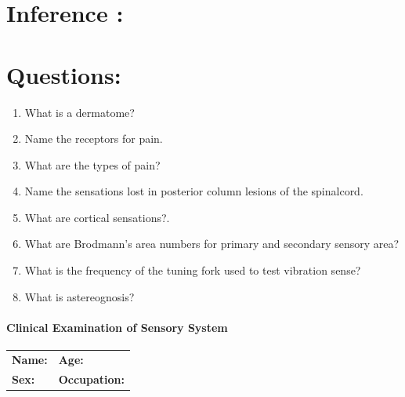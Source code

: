 \documentclass[a4paper,12pt]{book}
\begin{document}
\section*{Inference :}
\vspace{2in}



\section*{Questions:}
\begin{enumerate}
\item{What is a dermatome?}
\item{Name the receptors for pain.}
\item{What are the types of pain?}
\item{Name the sensations lost in posterior column lesions of the spinalcord.}
\item{What are cortical sensations?.}
\item{What are Brodmann’s area numbers for primary and secondary sensory area?}
\item{What is the frequency of the tuning fork used to test vibration sense?}
\item{What is astereognosis?}
\end{enumerate}

\newpage
\centering \paragraph{Clinical Examination of Sensory System}
															\begin{tabular}{p{5in} p{1in}}
																\textbf{Name:}  & \textbf{Age:}\\
																\textbf{Sex:} & \textbf{Occupation:}
															\end{tabular}
	
\end{document}
